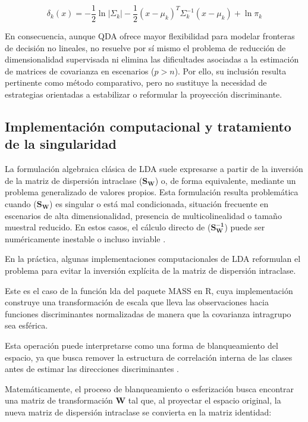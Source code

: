 \begin{equation}
	\delta_k(x) = -\frac{1}{2} \ln |\Sigma_k| - \frac{1}{2} (x - \mu_k)^T \Sigma_k^{-1} (x - \mu_k) + \ln \pi_k
	\label{eq:EMT8}
\end{equation}

En consecuencia, aunque QDA ofrece mayor flexibilidad para modelar fronteras de decisión no lineales, no resuelve por sí mismo el problema de reducción de dimensionalidad supervisada ni elimina las dificultades asociadas a la estimación de matrices de covarianza en escenarios ($p>n$). Por ello, su inclusión resulta pertinente como método comparativo, pero no sustituye la necesidad de estrategias orientadas a estabilizar o reformular la proyección discriminante.

\subsection{Implementación computacional y tratamiento de la singularidad}

La formulación algebraica clásica de LDA suele expresarse a partir de la inversión de la matriz de dispersión intraclase ($\mathbf{S_W}$) o, de forma equivalente, mediante un problema generalizado de valores propios. Esta formulación resulta problemática cuando ($\mathbf{S_W}$) es singular o está mal condicionada, situación frecuente en escenarios de alta dimensionalidad, presencia de multicolinealidad o tamaño muestral reducido. En estos casos, el cálculo directo de ($\mathbf{S_W^{-1}}$) puede ser numéricamente inestable o incluso inviable \cite{friedman1989regularized}.

En la práctica, algunas implementaciones computacionales de LDA reformulan el problema para evitar la inversión explícita de la matriz de dispersión intraclase. 

Este es el caso de la función lda del paquete MASS en R, cuya implementación construye una transformación de escala que lleva las observaciones hacia funciones discriminantes normalizadas de manera que la covarianza intragrupo sea esférica.

Esta operación puede interpretarse como una forma de blanqueamiento del espacio, ya que busca remover la estructura de correlación interna de las clases antes de estimar las direcciones discriminantes \cite{venables2002modern}.

Matemáticamente, el proceso de blanqueamiento o esferización busca encontrar una matriz de transformación $\mathbf{W}$ tal que, al proyectar el espacio original, la nueva matriz de dispersión intraclase se convierta en la matriz identidad:

